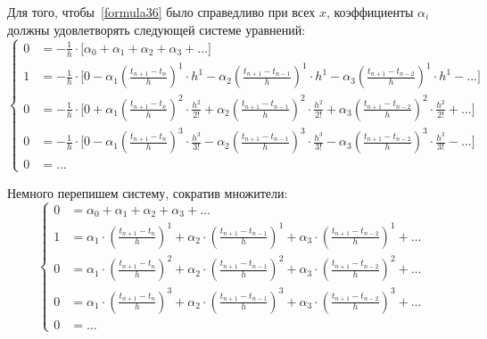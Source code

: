 Для того, чтобы~\eqref{formula36} было справедливо при всех $x$, коэффициенты $\alpha_i$ должны удовлетворять следующей системе уравнений:
\begin{equation}
\label{formula37}
\left\{
\begin{aligned}
0 & =-\frac 1 h \cdot \bigg[\alpha_0+\alpha_1+\alpha_2+\alpha_3+\dots \bigg]\\
1 & =-\frac 1 h \cdot \bigg[0-\alpha_1\left(\frac{t_{n+1}-t_n}{h} \right)^1\cdot h^1-\alpha_2\left(\frac{t_{n+1}-t_{n-1}}{h} \right)^1\cdot h^1 - \alpha_3\left(\frac{t_{n+1}-t_{n-2}}{h} \right)^1\cdot h^1 - ... \bigg] \\
0 & =-\frac 1 h \cdot \bigg[0+\alpha_1\left(\frac{t_{n+1}-t_n}{h} \right)^2\cdot\frac{h^2}{2!} +\alpha_2\left(\frac{t_{n+1}-t_{n-1}}{h} \right)^2\cdot\frac{h^2}{2!} + \alpha_3\left(\frac{t_{n+1}-t_{n-2}}{h} \right)^2\cdot\frac{h^2}{2!} + ... \bigg] \\
0 & =-\frac 1 h \cdot \bigg[0-\alpha_1\left(\frac{t_{n+1}-t_n}{h} \right)^3\cdot\frac{h^3}{3!}-\alpha_2\left(\frac{t_{n+1}-t_{n-1}}{h} \right)^3\cdot\frac{h^3}{3!}- \alpha_3\left(\frac{t_{n+1}-t_{n-2}}{h} \right)^3\cdot\frac{h^3}{3!} - ... \bigg] \\
0 & = \dots
\end{aligned}
\right.
\end{equation}

Немного перепишем систему, сократив множители:
\begin{equation}
\label{formula38}
\left\{
\begin{aligned}
0 & = \alpha_0+\alpha_1+\alpha_2+\alpha_3+\dots\\
1 & = \alpha_1\cdot\left(\frac{t_{n+1}-t_n}{h} \right)^1 +\alpha_2\cdot\left(\frac{t_{n+1}-t_{n-1}}{h} \right)^1 + \alpha_3\cdot\left(\frac{t_{n+1}-t_{n-2}}{h} \right)^1 + \dots  \\
0 & =\alpha_1\cdot\left(\frac{t_{n+1}-t_n}{h} \right)^2 +\alpha_2\cdot\left(\frac{t_{n+1}-t_{n-1}}{h} \right)^2 + \alpha_3\cdot\left(\frac{t_{n+1}-t_{n-2}}{h} \right)^2 + \dots \\
0 & =\alpha_1\cdot\left(\frac{t_{n+1}-t_n}{h} \right)^3+\alpha_2\cdot\left(\frac{t_{n+1}-t_{n-1}}{h} \right)^3+ \alpha_3\cdot\left(\frac{t_{n+1}-t_{n-2}}{h} \right)^3 + \dots \\
0 & = \dots
\end{aligned}
\right.
\end{equation}

